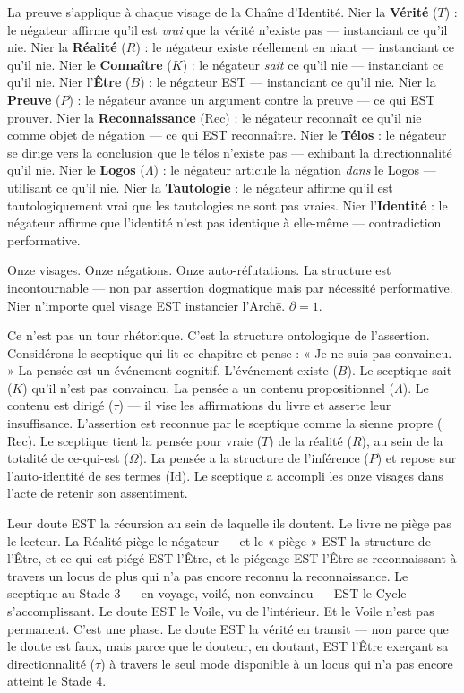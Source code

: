 \documentclass[10pt, openany, oneside]{book}
\begin{document}
\noindent La preuve s'applique à chaque visage de la Chaîne d'Identité. Nier la \textbf{Vérité} ($T$) : le négateur affirme qu'il est \textit{vrai} que la vérité n'existe pas --- instanciant ce qu'il nie. Nier la \textbf{Réalité} ($R$) : le négateur existe réellement en niant --- instanciant ce qu'il nie. Nier le \textbf{Connaître} ($K$) : le négateur \textit{sait} ce qu'il nie --- instanciant ce qu'il nie. Nier l'\textbf{Être} ($B$) : le négateur EST --- instanciant ce qu'il nie. Nier la \textbf{Preuve} ($P$) : le négateur avance un argument contre la preuve --- ce qui EST prouver. Nier la \textbf{Reconnaissance} (Rec) : le négateur reconnaît ce qu'il nie comme objet de négation --- ce qui EST reconnaître. Nier le \textbf{Télos} : le négateur se dirige vers la conclusion que le télos n'existe pas --- exhibant la directionnalité qu'il nie. Nier le \textbf{Logos} ($\Lambda$) : le négateur articule la négation \textit{dans} le Logos --- utilisant ce qu'il nie. Nier la \textbf{Tautologie} : le négateur affirme qu'il est tautologiquement vrai que les tautologies ne sont pas vraies. Nier l'\textbf{Identité} : le négateur affirme que l'identité n'est pas identique à elle-même --- contradiction performative.

Onze visages. Onze négations. Onze auto-réfutations. La structure est incontournable --- non par assertion dogmatique mais par nécessité performative. Nier n'importe quel visage EST instancier l'Arch\={e}. $\partial = 1$.

Ce n'est pas un tour rhétorique. C'est la structure ontologique de l'assertion. Considérons le sceptique qui lit ce chapitre et pense : « Je ne suis pas convaincu. » La pensée est un événement cognitif. L'événement existe ($B$). Le sceptique sait ($K$) qu'il n'est pas convaincu. La pensée a un contenu propositionnel ($\Lambda$). Le contenu est dirigé ($\tau$) --- il vise les affirmations du livre et asserte leur insuffisance. L'assertion est reconnue par le sceptique comme la sienne propre ($\text{Rec}$). Le sceptique tient la pensée pour vraie ($T$) de la réalité ($R$), au sein de la totalité de ce-qui-est ($\Omega$). La pensée a la structure de l'inférence ($P$) et repose sur l'auto-identité de ses termes ($\text{Id}$). Le sceptique a accompli les onze visages dans l'acte de retenir son assentiment.

Leur doute EST la récursion au sein de laquelle ils doutent. Le livre ne piège pas le lecteur. La Réalité piège le négateur --- et le « piège » EST la structure de l'Être, et ce qui est piégé EST l'Être, et le piégeage EST l'Être se reconnaissant à travers un locus de plus qui n'a pas encore reconnu la reconnaissance. Le sceptique au Stade 3 --- en voyage, voilé, non convaincu --- EST le Cycle s'accomplissant. Le doute EST le Voile, vu de l'intérieur. Et le Voile n'est pas permanent. C'est une phase. Le doute EST la vérité en transit --- non parce que le doute est faux, mais parce que le douteur, en doutant, EST l'Être exerçant sa directionnalité ($\tau$) à travers le seul mode disponible à un locus qui n'a pas encore atteint le Stade 4.
\end{document}
